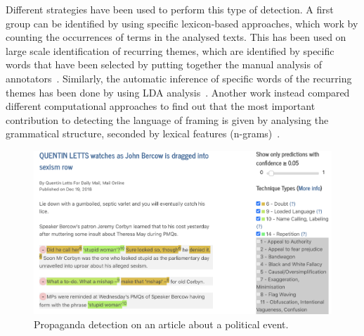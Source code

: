 Different strategies have been used to perform this type of detection.
A first group can be identified by using specific lexicon-based approaches, which work by counting the occurrences of terms in the analysed texts.
This has been used on large scale identification of recurring themes, which are identified by specific words that have been selected by putting together the manual analysis of annotators~\cite{field2018framing}.
Similarly, the automatic inference of specific words of the recurring themes has been done by using LDA analysis~\cite{tsur2015frame}.
Another work instead compared different computational approaches to find out that the most important contribution to detecting the language of framing is given by analysing the grammatical structure, seconded by lexical features (n-grams)~\cite{baumer2015testing}.


\begin{figure}[!htb]
    \centering
    \includegraphics[width=\linewidth]{figures/brexit_propaganda.png}
    \caption{Propaganda detection on an article about a political event.}
    \label{fig:brexit_propaganda}
\end{figure}


